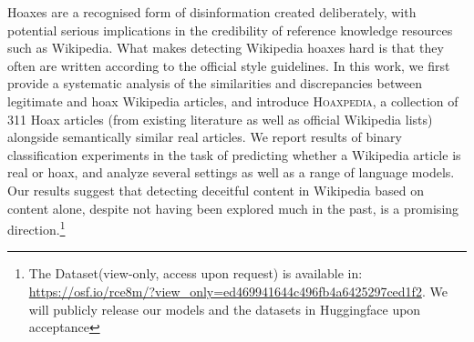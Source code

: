 Hoaxes are a recognised form of disinformation created deliberately, with potential serious implications in the credibility of reference knowledge resources such as Wikipedia. What makes detecting Wikipedia hoaxes hard is that they often are written according to the official style guidelines. In this work, we first provide a systematic analysis of the similarities and discrepancies between legitimate and hoax Wikipedia articles, and introduce \textsc{Hoaxpedia}, a collection of 311 Hoax articles (from existing literature as well as official Wikipedia lists) alongside semantically similar real articles. We report results of binary classification experiments in the task of predicting whether a Wikipedia article is real or hoax, and analyze several settings as well as a range of language models. Our results suggest that detecting deceitful content in Wikipedia based on content alone, despite not having been explored much in the past, is a promising direction.\footnote{The Dataset(view-only, access upon request) is available in: \url{https://osf.io/rce8m/?view_only=ed469941644c496fb4a6425297ced1f2}. We will publicly release our models and the datasets in Huggingface upon acceptance}